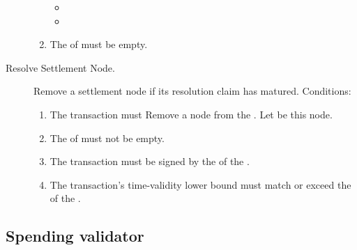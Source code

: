 \documentclass[../midgard.tex]{subfiles}
\begin{document}
\begin{description}
\begin{enumerate}
\begin{itemize}
            \item {}
            \item {}
          \end{itemize}
        \item The  of  must be empty.
      \end{enumerate}
  \item[Resolve Settlement Node.] Remove a settlement node if its resolution claim has matured.
    Conditions:
      \begin{enumerate}
        \item The transaction must Remove a node from the .
          Let  be this node.
        \item The  of  must not be empty.
        \item The transaction must be signed by the  of the .
        \item The transaction's time-validity lower bound must match or exceed the  of the .
      \end{enumerate}
\end{description}

\subsection{Spending validator}
\label{h:settlement-queue-spending-validator}
\end{document}
